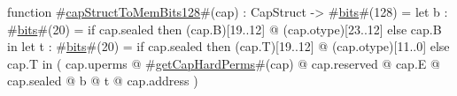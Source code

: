 function #\hyperref[zcapStructToMemBitsonetwoeight]{capStructToMemBits128}#(cap) : CapStruct -> #\hyperref[zbits]{bits}#(128) =
    let b : #\hyperref[zbits]{bits}#(20) = if cap.sealed then (cap.B)[19..12] @ (cap.otype)[23..12] else cap.B in
    let t : #\hyperref[zbits]{bits}#(20) = if cap.sealed then (cap.T)[19..12] @ (cap.otype)[11..0]  else cap.T in
    ( cap.uperms
    @ #\hyperref[zgetCapHardPerms]{getCapHardPerms}#(cap)
    @ cap.reserved
    @ cap.E
    @ cap.sealed
    @ b
    @ t
    @ cap.address
    )
